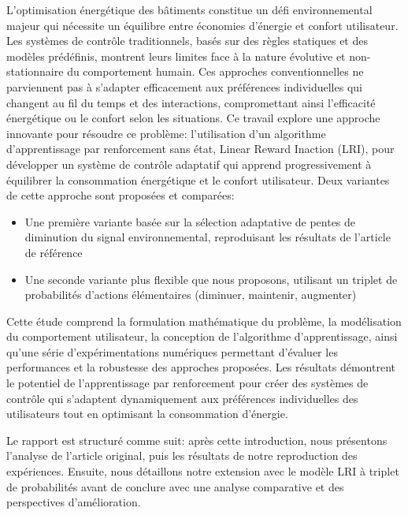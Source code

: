 
L'optimisation énergétique des bâtiments constitue un défi environnemental majeur qui nécessite un équilibre entre économies d'énergie et confort utilisateur. Les systèmes de contrôle traditionnels, basés sur des règles statiques et des modèles prédéfinis, montrent leurs limites face à la nature évolutive et non-stationnaire du comportement humain. Ces approches conventionnelles ne parviennent pas à s'adapter efficacement aux préférences individuelles qui changent au fil du temps et des interactions, compromettant ainsi l'efficacité énergétique ou le confort selon les situations.
Ce travail explore une approche innovante pour résoudre ce problème: l'utilisation d'un algorithme d'apprentissage par renforcement sans état, Linear Reward Inaction (LRI), pour développer un système de contrôle adaptatif qui apprend progressivement à équilibrer la consommation énergétique et le confort utilisateur. Deux variantes de cette approche sont proposées et comparées:
\begin{itemize}
    \item Une première variante basée sur la sélection adaptative de pentes de diminution du signal environnemental, reproduisant les résultats de l'article de référence \cite{haddam2022}
    \item Une seconde variante plus flexible que nous proposons, utilisant un triplet de probabilités d'actions élémentaires (diminuer, maintenir, augmenter)
\end{itemize}

Cette étude comprend la formulation mathématique du problème, la modélisation du comportement utilisateur, la conception de l'algorithme d'apprentissage, ainsi qu'une série d'expérimentations numériques permettant d'évaluer les performances et la robustesse des approches proposées. Les résultats démontrent le potentiel de l'apprentissage par renforcement pour créer des systèmes de contrôle qui s'adaptent dynamiquement aux préférences individuelles des utilisateurs tout en optimisant la consommation d'énergie.

Le rapport est structuré comme suit: après cette introduction, nous présentons l'analyse de l'article original, puis les résultats de notre reproduction des expériences. Ensuite, nous détaillons notre extension avec le modèle LRI à triplet de probabilités avant de conclure avec une analyse comparative et des perspectives d'amélioration.
